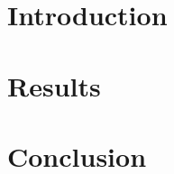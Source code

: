 \documentclass[doutorado, spanish, brazil, english]{packages/icmc}
\begin{document}
\textual

\chapter{Introduction}
\label{chapter:introducao}


%

%

%

%

%

\chapter{Results}
\label{chapter:results}
%





\chapter{Conclusion}



\end{document}
